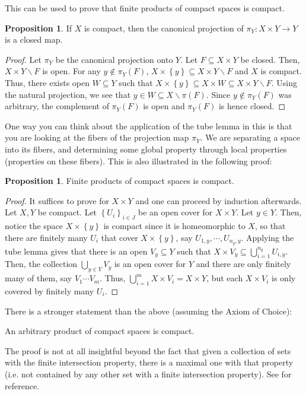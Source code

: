 \documentclass[12pt,reqno]{amsart}
\numberwithin{theorem}{section}
\theoremstyle{definition}
\theoremstyle{remark}
\numberwithin{equation}{section}
\newcommand{\set}[1]{\left \{ #1 \right \}}
\theoremstyle{definition}
\newtheorem{prop}[theorem]{Proposition}
\begin{document}
This can be used to prove that finite products of compact spaces is compact. 
\begin{prop}\label{kuratowski}
    If $X$ is compact, then the canonical projection of $\pi_Y:X\times Y\rightarrow Y$ is a closed map.
\end{prop}
\begin{proof}
    Let $\pi_Y$ be the canonical projection onto $Y$. Let $F\subseteq X\times Y$ be closed. Then, $X\times Y \backslash F$ is open. For any $y \notin \pi_Y(F)$, $X\times \set y \subseteq X\times Y \backslash F$ and $X$ is compact. Thus, there exists open $W \subseteq Y$ such that $X\times \set y \subseteq X\times W \subseteq X\times Y \backslash F$. Using the natural projection, we see that $y \in W \subseteq X\backslash \pi(F)$. Since $y \notin \pi_Y(F)$ was arbitrary, the complement of $\pi_Y(F)$ is open and $\pi_Y(F)$ is hence closed.
\end{proof}
One way you can think about the application of the tube lemma in this is that you are looking at the fibers of the projection map $\pi_Y$. We are separating a space into its fibers, and determining some global property through local properties (properties on these fibers). This is also illustrated in the following proof:
\begin{prop}
    Finite products of compact spaces is compact.
\end{prop}
\begin{proof}
    It suffices to prove for $X\times Y$ and one can proceed by induction afterwards. Let $X,Y$ be compact. Let $\set{U_i}_{i \in J}$ be an open cover for $X\times Y$. Let $y \in Y$. Then, notice the space $X \times \set y$ is compact since it is homeomorphic to $X$, so that there are finitely many $U_i$ that cover $X \times \set {y}$, say $U_{1,y},\cdots, U_{n_y,y}$. Applying the tube lemma gives that there is an open $V_y \subseteq Y$ such that $X\times V_y \subseteq \bigcup_{i=1}^{n_y} U_{i,y}$. Then, the collection $\bigcup_{y \in Y} V_y$ is an open cover for $Y$ and there are only finitely many of them, say $V_1 \cdots V_m$. Thus, $\bigcup_{i=1}^mX\times V_{i} = X\times Y$, but each $X\times V_{i}$ is only covered by finitely many $U_i$.
\end{proof}

There is a stronger statement than the above (assuming the Axiom of Choice):
\begin{theorem}
    An arbitrary product of compact spaces is compact.
\end{theorem}
The proof is not at all insightful beyond the fact that given a collection of sets with the finite intersection property, there is a maximal one with that property (i.e. not contained by any other set with a finite intersection property). See \cite{munkres} for reference.
\end{document}
